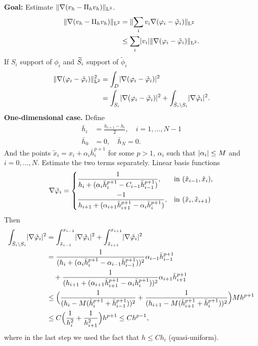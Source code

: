 \documentclass[10pt]{article}
\begin{document}
\textbf{Goal:} Estimate $\norm{\nabla (v_h - \Pi_h v_h)}_{\LL^2}$.
\begin{equation}
\begin{aligned}
	\norm{\nabla (v_h - \Pi_h v_h)}_{\LL^2} &= \norm{\sum_i v_i \nabla(\phi_i - \tilde \phi_i)}_{\LL^2}\\
	&\leq \sum_i \abs{v_i} \norm{\nabla(\phi_i - \tilde \phi_i)}_{\LL^2}.
\end{aligned}
\end{equation}
If $S_i$ support of $\phi_i$ and $\btilde S_i$ support of $\tilde \phi_i$
\begin{equation}
\begin{aligned}
	\norm{\nabla(\phi_i - \tilde \phi_i)}^2_{\LL^2} &= \int_D \abs{\nabla(\phi_i - \tilde \phi_i)}^2\\
	&= \int_{S_i} \abs{\nabla(\phi_i - \tilde \phi_i)}^2 + \int_{\tilde S_i \setminus S_i} \abs{\nabla \tilde \phi_i}^2.
\end{aligned}
\end{equation}
\textbf{One-dimensional case.} Define
\begin{equation}
\begin{aligned}
	\bar h_i &= \frac{h_{i+1} - h_i}{2}, \quad i = 1, \ldots, N-1 \\
	\bar h_0 &= 0, \quad \bar h_N = 0.
\end{aligned}
\end{equation}
And the points $\tilde x_i = x_i + \alpha_i\bar h_i^{p+1}$ for some $p > 1$, $\alpha_i$ such that $\abs{\alpha_i} \leq M$ and $i = 0, \ldots, N$. Estimate the two terms separately. Linear basis functions
\begin{equation}
\nabla \tilde \phi_i = \begin{dcases}
\frac{1}{h_i + (\alpha_i\bar h_i^{p+1} - C_{i-1}\bar h_{i-1}^{p+1})}, & \mbox{in } (\tilde x_{i-1}, \tilde x_i), \\
\frac{-1}{h_{i+1} + (\alpha_{i+1}\bar h_{i+1}^{p+1} - \alpha_i\bar h_i^{p+1})}, & \mbox{in } (\tilde x_i, \tilde x_{i+1})
\end{dcases}
\end{equation}
Then
\begin{equation}
\begin{aligned}
\int_{\tilde S_i \setminus S_i} \abs{\nabla \tilde \phi_i}^2 &= \int_{\tilde x_{i-1}}^{x_{i-1}}\abs{\nabla \tilde \phi_i}^2 + \int_{\tilde x_{i+1}}^{x_{i+1}}\abs{\nabla \tilde \phi_i}^2 \\
&= \frac{1}{(h_i + (\alpha_i\bar h_i^{p+1} - \alpha_{i-1}\bar h_{i-1}^{p+1}))^2} \alpha_{i-1} \bar h_{i-1}^{p+1} \\
&\quad + \frac{1}{(h_{i+1} + (\alpha_{i+1}\bar h_{i+1}^{p+1} - \alpha_i\bar h_i^{p+1}))^2} \alpha_{i+1} \bar h_{i+1}^{p+1} \\
&\leq \Big(\frac{1}{(h_i - M(\bar h_i^{p+1} + \bar h_{i-1}^{p+1}))^2} + \frac{1}{(h_{i+1} -M (\bar h_{i+1}^{p+1} + \bar h_i^{p+1}))^2} \Big) M h^{p+1} \\
&\leq C\Big(\frac{1}{h_i^2} + \frac{1}{h_{i+1}^2}\Big)h^{p+1} \leq Ch^{p-1},
\end{aligned}
\end{equation}
where in the last step we used the fact that $h \leq C h_i$ (quasi-uniform).
\end{document}
